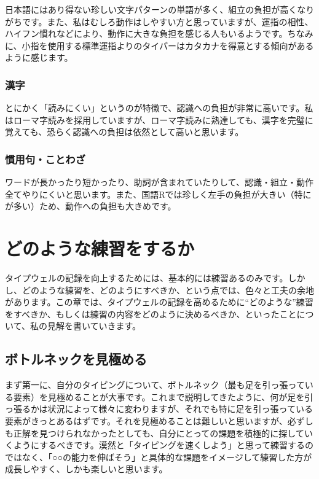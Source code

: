 日本語にはあり得ない珍しい文字パターンの単語が多く、組立の負担が高くなりがちです。また、私はむしろ動作はしやすい方と思っていますが、運指の相性、ハイフン慣れなどにより、動作に大きな負担を感じる人もいるようです。ちなみに、小指を使用する標準運指よりのタイパーはカタカナを得意とする傾向があるように感じます。

\subsubsection*{漢字}

とにかく「読みにくい」というのが特徴で、認識への負担が非常に高いです。私はローマ字読みを採用していますが、ローマ字読みに熟達しても、漢字を完璧に覚えても、恐らく認識への負担は依然として高いと思います。

\subsubsection*{慣用句・ことわざ}

ワードが長かったり短かったり、助詞が含まれていたりして、認識・組立・動作全てやりにくいと思います。また、国語Rでは珍しく左手の負担が大きい（特に が多い）ため、動作への負担も大きめです。

\section{どのような練習をするか}

タイプウェルの記録を向上するためには、基本的には練習あるのみです。しかし、どのような練習を、どのようにすべきか、という点では、色々と工夫の余地があります。この章では、タイプウェルの記録を高めるために“どのような”練習をすべきか、もしくは練習の内容をどのように決めるべきか、といったことについて、私の見解を書いていきます。

\subsection{ボトルネックを見極める}

まず第一に、自分のタイピングについて、ボトルネック（最も足を引っ張っている要素）を見極めることが大事です。これまで説明してきたように、何が足を引っ張るかは状況によって様々に変わりますが、それでも特に足を引っ張っている要素がきっとあるはずです。それを見極めることは難しいと思いますが、必ずしも正解を見つけられなかったとしても、自分にとっての課題を積極的に探していくようにするべきです。漠然と「タイピングを速くしよう」と思って練習するのではなく、「○○の能力を伸ばそう」と具体的な課題をイメージして練習した方が成長しやすく、しかも楽しいと思います。

